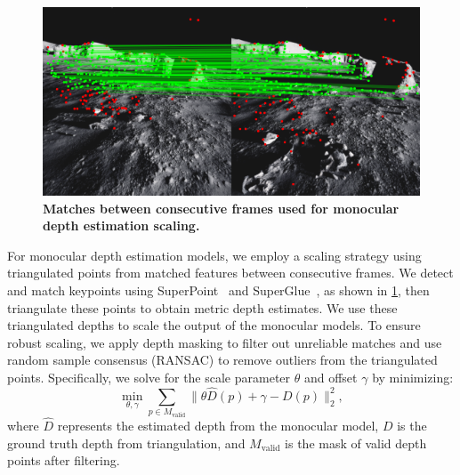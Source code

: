 \begin{figure}[t]
	\centering
	\includegraphics[width=\linewidth]{figures/matches.png}
	\caption{\bfseries Matches between consecutive frames used for monocular depth estimation scaling.}
	\label{fig:matches}
\end{figure}
For monocular depth estimation models, we employ a scaling strategy using triangulated points from matched features between consecutive frames. We detect and match keypoints using SuperPoint~\cite{detone_superpoint_2018} and SuperGlue~\cite{sarlin_superglue_2020}, as shown in \cref{fig:matches}, then triangulate these points to obtain metric depth estimates. We use these triangulated depths to scale the output of the monocular models. To ensure robust scaling, we apply depth masking to filter out unreliable matches and use random sample consensus (RANSAC) to remove outliers from the triangulated points. Specifically, we solve for the scale parameter $\theta$ and offset $\gamma$ by minimizing:
\begin{equation}
	\min_{\theta,\gamma} \sum_{p \in M_{\text{valid}}} \|\theta \hat{D}(p) + \gamma - D(p)\|_2^2,
\end{equation}
where $\hat{D}$ represents the estimated depth from the monocular model, $D$ is the ground truth depth from triangulation, and $M_{\text{valid}}$ is the mask of valid depth points after filtering.

